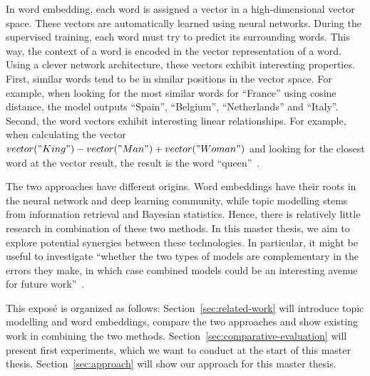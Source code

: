 \documentclass{sig-alternate-05-2015}
\begin{document}
In word embedding, each word is assigned a vector in a high-dimensional vector space.
These vectors are automatically learned using neural networks.
During the supervised training, each word must try to predict its surrounding words.
This way, the context of a word is encoded in the vector representation of a word.
Using a clever network architecture, these vectors exhibit interesting properties.
First, similar words tend to be in similar positions in the vector space.
For example, when looking for the most similar words for ``France'' using cosine distance, the model outputs ``Spain'', ``Belgium'', ``Netherlands'' and ``Italy''.
Second, the word vectors exhibit interesting linear relationships.
For example, when calculating the vector $vector("King") - vector("Man") + vector("Woman")$ and looking for the closest word at the vector result, the result is the word ``queen''~\cite{Mikolov2013b}.

The two approaches have different origins.
Word embeddings have their roots in the neural network and deep learning community, while topic modelling stems from information retrieval and Bayesian statistics.
Hence, there is relatively little research in combination of these two methods.
In this master thesis, we aim to explore potential synergies between these technologies.
In particular, it might be useful to investigate ``whether the two types of models are complementary in the errors they make, in which case combined models could be an interesting avenue for future work''~\cite{Baroni2014}.

This expos\'e is organized as follows: Section~\ref{sec:related-work} will introduce topic modelling and word embeddings, compare the two approaches and show existing work in combining the two methods.
Section~\ref{sec:comparative-evaluation} will present first experiments, which we want to conduct at the start of this master thesis.
Section~\ref{sec:approach} will show our approach for this master thesis.
\end{document}
